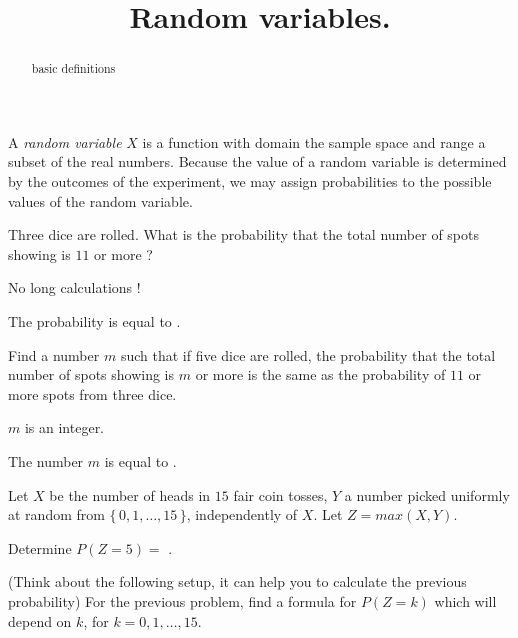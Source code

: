 \documentclass{ximera}
\title{Random variables.}
\begin{document}
\begin{abstract}
basic definitions
\end{abstract}
\maketitle

A {\it random variable} $X$ is a function with domain the sample space and range a subset of the real numbers. Because the value of a random variable is determined by the outcomes of the experiment, we may assign probabilities to the possible values of the random variable. \vspace{.35cm} 

\begin{question}
Three dice are rolled. What is the probability that the total number of spots showing is $11$ or more ?
     \begin{hint}
          No long calculations ! 
     \end{hint}
     \begin{solution}
          The probability is equal to .
     \end{solution}
\end{question}

\begin{question}
Find a number $m$ such that if five dice are rolled, the probability that the total number of spots showing is $m$ or more is the same as the probability of $11$ or more spots from three dice.
     \begin{hint}
          $m$ is an integer.
     \end{hint}
     \begin{solution}
          The number $m$ is equal to .
     \end{solution}
\end{question}

Let $X$ be the number of heads in $15$ fair coin tosses, $Y$ a number picked uniformly at random from $\{\, 0,1,\dots,15 \,\}$, independently of $X$. Let $Z = max(X,Y)$.

\begin{question}
     \begin{solution}
           Determine $P(Z=5) = $ .
     \end{solution}
\end{question}

(Think about the following setup, it can help you to calculate the previous probability) For the previous problem, find a formula for $P(Z=k)$ which will depend on $k$, for $k=0,1,\dots,15$. \vspace{.35cm}
\end{document}
